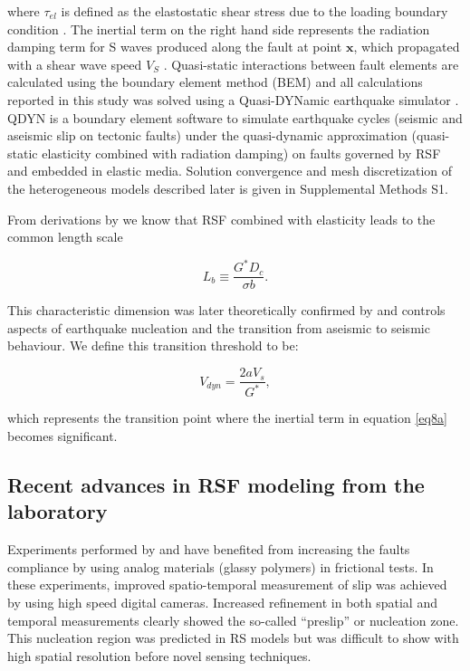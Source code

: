 \documentclass[preprint,1p, 10pt,authoryear]{elsarticle}
\begin{document}
\noindent where $\tau_{el}$ is defined as the elastostatic shear stress due to the loading boundary condition \citep{Horowitz1989}. The inertial term on the right hand side represents the radiation damping term for S waves produced along the fault at point $\mathbf{x}$, which propagated with a shear wave speed $V_{S}$ \citep{Rice1993}. Quasi-static interactions between fault elements are calculated using the boundary element method (BEM) and all calculations reported in this study was solved using a Quasi-DYNamic earthquake simulator \citep{Luo2017}. QDYN is a boundary element software to simulate earthquake cycles (seismic and aseismic slip on tectonic faults) under the quasi-dynamic approximation (quasi-static elasticity combined with radiation damping) on faults governed by RSF and embedded in elastic media.  Solution convergence and mesh discretization of the heterogeneous models described later is given in Supplemental Methods S1.

From derivations by \citet{Dieterich1992} we know that RSF combined with elasticity leads to the common length scale

\begin{equation}
\label{eq8b}
L_{b} \equiv \frac{G^{*}D_{c}}{\sigma b}.
\end{equation}  

\noindent This characteristic dimension was later theoretically confirmed by \citet{Rubin2005} and controls aspects of earthquake nucleation and the transition from aseismic to seismic behaviour. We define this transition threshold to be:

\begin{equation}
\label{eq8c}
V_{dyn} = \frac{2 a V_{s}}{G^{*}},
\end{equation}  

\noindent which represents the transition point where the inertial term in equation \eqref{eq8a} becomes significant. 

\subsection{Recent advances in RSF modeling from the laboratory}
\label{advances RSF}
Experiments performed by \citet{Nielsen2010} and \citet{Latour2013} have benefited from increasing the faults compliance by using analog materials (glassy polymers) in frictional tests. In these experiments, improved spatio-temporal measurement of slip was achieved by using high speed digital cameras. Increased refinement in both spatial and temporal measurements clearly showed the so-called ``preslip'' or nucleation zone.  This nucleation region was predicted in RS models \citep{Dieterich1992, Rubin2005, Ampuero2008} but was difficult to show with high spatial resolution before novel sensing techniques.
\end{document}
